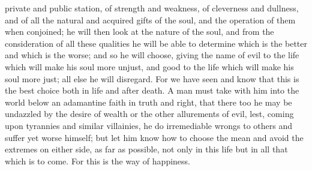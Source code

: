 \documentclass[12pt]{article}
\begin{document}
private and public station, of strength and weakness, of cleverness and
dullness, and of all the natural and acquired gifts of the soul, and the
operation of them when conjoined; he will then look at the nature of the soul,
and from the consideration of all these qualities he will be able to determine
which is the better and which is the worse; and so he will choose, giving the
name of evil to the life which will make his soul more unjust, and good to the
life which will make his soul more just; all else he will disregard. For we
have seen and know that this is the best choice both in life and after death. A
man must take with him into the world below an adamantine faith in truth and
right, that there too he may be undazzled by the desire of wealth or the other
allurements of evil, lest, coming upon tyrannies and similar villainies, he do
irremediable wrongs to others and suffer yet worse himself; but let him know
how to choose the mean and avoid the extremes on either side, as far as
possible, not only in this life but in all that which is to come. For this is
the way of happiness.
\end{document}
